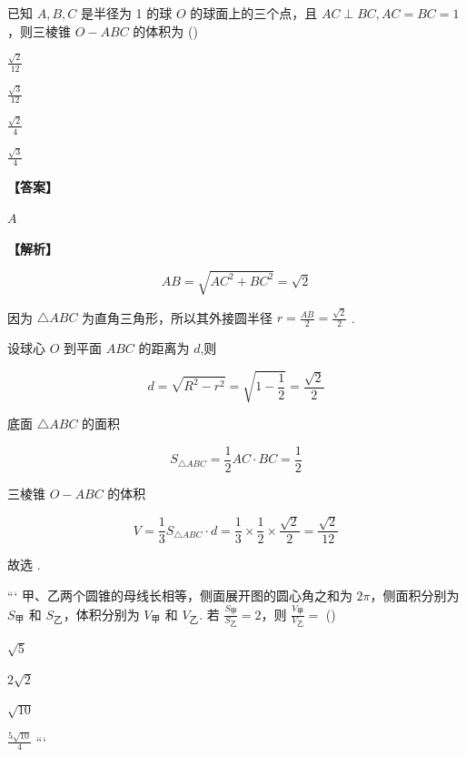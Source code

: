 \documentclass{exam-zh}
\newenvironment{answer}{\par\vspace{0.5em}\noindent\textbf{【答案】}\par}{\par\vspace{1em}}
\newenvironment{solutions}{\par\vspace{0.5em}\noindent\textbf{【解析】}\par}{\par\vspace{1em}}\usepackage{lastpage}
\begin{document}

\begin{question}
已知 $A, B, C$ 是半径为 1 的球 $O$ 的球面上的三个点，且 $AC \perp BC, AC=BC=1$，则三棱锥 $O-ABC$ 的体积为 (\hspace{1cm})
\begin{choices}
\item $\frac{\sqrt{2}}{12}$
\item $\frac{\sqrt{3}}{12}$
\item $\frac{\sqrt{2}}{4}$
\item $\frac{\sqrt{3}}{4}$
\end{choices}
\end{question}

\begin{answer}
$A$
\end{answer}

\begin{solutions}
$$
AB = \sqrt{AC^2 + BC^2} = \sqrt{2}
$$

因为 $\triangle ABC$ 为直角三角形，所以其外接圆半径 $r = \frac{AB}{2} = \frac{\sqrt{2}}{2}$ .

设球心 $O$ 到平面 $ABC$ 的距离为 $d$,则

$$
d = \sqrt{R^2 - r^2} = \sqrt{1 - \frac{1}{2}} = \frac{\sqrt{2}}{2}
$$

底面 $\triangle ABC$ 的面积

$$
S_{\triangle ABC} = \frac{1}{2} AC \cdot BC = \frac{1}{2}
$$

三棱锥 $O-ABC$ 的体积

$$
V = \frac{1}{3} S_{\triangle ABC} \cdot d = \frac{1}{3} \times \frac{1}{2} \times \frac{\sqrt{2}}{2} = \frac{\sqrt{2}}{12}
$$

故选  .
\end{solutions}


\begin{question}
```
甲、乙两个圆锥的母线长相等，侧面展开图的圆心角之和为 $2 \pi$，侧面积分别为 $S_{\text{甲}}$ 和 $S_{\text{乙}}$，体积分别为 $V_{\text{甲}}$ 和 $V_{\text{乙}}$. 若 $\frac{S_{\text{甲}}}{S_{\text{乙}}}=2$，则 $\frac{V_{\text{甲}}}{V_{\text{乙}}}=$ (\hspace{1cm})
\begin{choices}
\item $\sqrt{5}$
\item $2 \sqrt{2}$
\item $\sqrt{10}$
\item $\frac{5 \sqrt{10}}{4}$
```
\end{choices}
\end{question}
\end{document}
